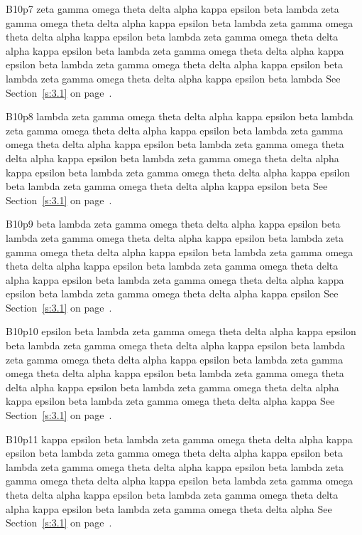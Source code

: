 B10p7 zeta gamma omega theta delta alpha kappa epsilon beta lambda zeta gamma omega theta delta alpha kappa epsilon beta lambda zeta gamma omega theta delta alpha kappa epsilon beta lambda zeta gamma omega theta delta alpha kappa epsilon beta lambda zeta gamma omega theta delta alpha kappa epsilon beta lambda zeta gamma omega theta delta alpha kappa epsilon beta lambda zeta gamma omega theta delta alpha kappa epsilon beta lambda See Section~\ref{s:3.1} on page~\pageref{s:3.1}.

B10p8 lambda zeta gamma omega theta delta alpha kappa epsilon beta lambda zeta gamma omega theta delta alpha kappa epsilon beta lambda zeta gamma omega theta delta alpha kappa epsilon beta lambda zeta gamma omega theta delta alpha kappa epsilon beta lambda zeta gamma omega theta delta alpha kappa epsilon beta lambda zeta gamma omega theta delta alpha kappa epsilon beta lambda zeta gamma omega theta delta alpha kappa epsilon beta See Section~\ref{s:3.1} on page~\pageref{s:3.1}.

B10p9 beta lambda zeta gamma omega theta delta alpha kappa epsilon beta lambda zeta gamma omega theta delta alpha kappa epsilon beta lambda zeta gamma omega theta delta alpha kappa epsilon beta lambda zeta gamma omega theta delta alpha kappa epsilon beta lambda zeta gamma omega theta delta alpha kappa epsilon beta lambda zeta gamma omega theta delta alpha kappa epsilon beta lambda zeta gamma omega theta delta alpha kappa epsilon See Section~\ref{s:3.1} on page~\pageref{s:3.1}.

B10p10 epsilon beta lambda zeta gamma omega theta delta alpha kappa epsilon beta lambda zeta gamma omega theta delta alpha kappa epsilon beta lambda zeta gamma omega theta delta alpha kappa epsilon beta lambda zeta gamma omega theta delta alpha kappa epsilon beta lambda zeta gamma omega theta delta alpha kappa epsilon beta lambda zeta gamma omega theta delta alpha kappa epsilon beta lambda zeta gamma omega theta delta alpha kappa See Section~\ref{s:3.1} on page~\pageref{s:3.1}.

B10p11 kappa epsilon beta lambda zeta gamma omega theta delta alpha kappa epsilon beta lambda zeta gamma omega theta delta alpha kappa epsilon beta lambda zeta gamma omega theta delta alpha kappa epsilon beta lambda zeta gamma omega theta delta alpha kappa epsilon beta lambda zeta gamma omega theta delta alpha kappa epsilon beta lambda zeta gamma omega theta delta alpha kappa epsilon beta lambda zeta gamma omega theta delta alpha See Section~\ref{s:3.1} on page~\pageref{s:3.1}.

